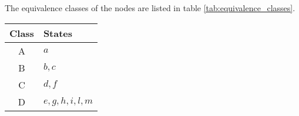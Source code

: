 The equivalence classes of the nodes are listed in table \cref{tab:equivalence_classes}.
\begin{center}
    \begin{tabular}{|c|l|}
    \hline
    \textbf{Class} & \textbf{States} \\
    \hline
    A & $a$ \\
    B & $b, c$ \\
    C & $d, f$ \\
    D & $e, g, h, i, l, m$ \\
    \hline
    \end{tabular}
    \label{tab:equivalence_classes}
\end{center}